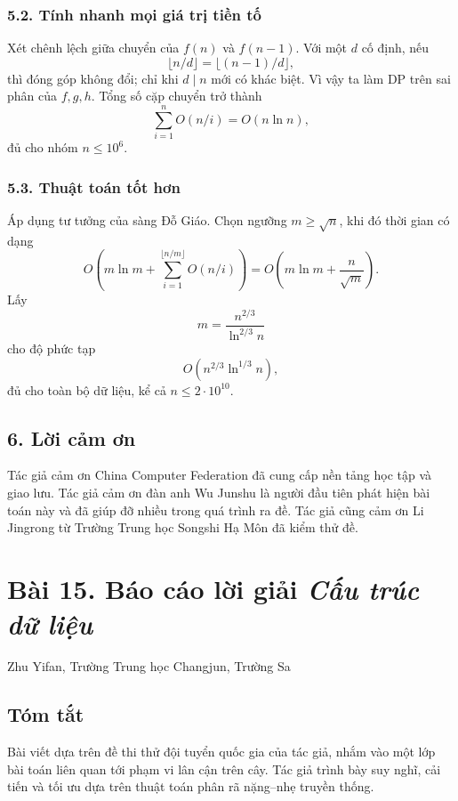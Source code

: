 \documentclass[11pt]{article}
\begin{document}
\subsubsection*{5.2. Tính nhanh mọi giá trị tiền tố}

Xét chênh lệch giữa chuyển của \(f(n)\) và \(f(n-1)\). Với một \(d\) cố định,
nếu
\[
  \lfloor n/d\rfloor=\lfloor (n-1)/d\rfloor,
\]
thì đóng góp không đổi; chỉ khi \(d\mid n\) mới có khác biệt. Vì vậy ta làm DP
trên sai phân của \(f,g,h\). Tổng số cặp chuyển trở thành
\[
  \sum_{i=1}^{n} O(n/i)=O(n\ln n),
\]
đủ cho nhóm \(n\le 10^6\).

\subsubsection*{5.3. Thuật toán tốt hơn}

Áp dụng tư tưởng của sàng Đỗ Giáo. Chọn ngưỡng \(m\ge\sqrt n\), khi đó thời
gian có dạng
\[
  O\left(m\ln m+\sum_{i=1}^{\lfloor n/m\rfloor} O(n/i)\right)
  =
  O\left(m\ln m+\frac{n}{\sqrt m}\right).
\]
Lấy
\[
  m=\frac{n^{2/3}}{\ln^{2/3}n}
\]
cho độ phức tạp
\[
  O\left(n^{2/3}\ln^{1/3}n\right),
\]
đủ cho toàn bộ dữ liệu, kể cả \(n\le 2\cdot 10^{10}\).

\subsection*{6. Lời cảm ơn}

Tác giả cảm ơn China Computer Federation đã cung cấp nền tảng học tập và giao
lưu. Tác giả cảm ơn đàn anh Wu Junshu là người đầu tiên phát hiện bài toán này
và đã giúp đỡ nhiều trong quá trình ra đề. Tác giả cũng cảm ơn Li Jingrong từ
Trường Trung học Songshi Hạ Môn đã kiểm thử đề.

\section*{Bài 15. Báo cáo lời giải \emph{Cấu trúc dữ liệu}}

\begin{center}
Zhu Yifan, Trường Trung học Changjun, Trường Sa
\end{center}

\subsection*{Tóm tắt}

Bài viết dựa trên đề thi thử đội tuyển quốc gia của tác giả, nhắm vào một lớp
bài toán liên quan tới phạm vi lân cận trên cây. Tác giả trình bày suy nghĩ,
cải tiến và tối ưu dựa trên thuật toán phân rã nặng--nhẹ truyền thống.
\end{document}
